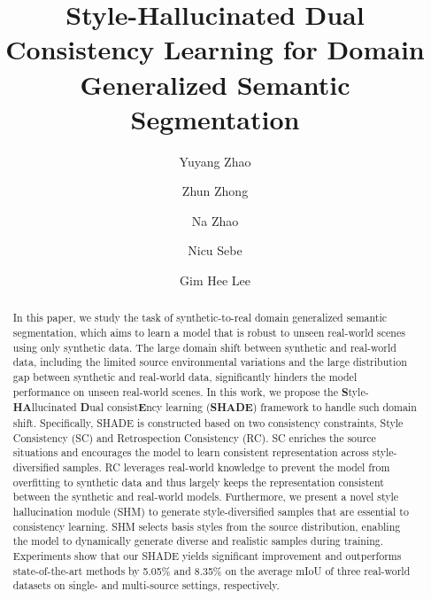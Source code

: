 \documentclass[runningheads]{llncs}
\newcommand{\ours}{SHADE\xspace}
\begin{document}
\pagestyle{headings}
\mainmatter
\def\ECCVSubNumber{86}  

\title{Style-Hallucinated Dual Consistency Learning for Domain Generalized Semantic Segmentation}

\begin{comment}
\end{comment}


\author{Yuyang Zhao \and Zhun Zhong \and Na Zhao \and Nicu Sebe \and Gim Hee Lee}
\maketitle

\begin{abstract}

In this paper, we study the task of synthetic-to-real domain generalized semantic segmentation, which aims to learn a model that is robust to unseen real-world scenes using only synthetic data. The large domain shift between synthetic and real-world data, including the limited source environmental variations and the large distribution gap between synthetic and real-world data, significantly hinders the model performance on unseen real-world scenes. In this work, we propose the \textbf{S}tyle-\textbf{HA}llucinated \textbf{D}ual consist\textbf{E}ncy learning (\textbf{\ours}) framework to handle such domain shift. Specifically, \ours is constructed based on two consistency constraints, Style Consistency (SC) and Retrospection Consistency (RC). SC enriches the source situations and encourages the model to learn consistent representation across style-diversified samples. 
RC leverages real-world knowledge to prevent the model from overfitting to synthetic data and thus largely keeps the representation consistent between the synthetic and real-world models. 
Furthermore, we present a novel style hallucination module (SHM) to generate style-diversified samples that are essential to consistency learning. 
SHM selects basis styles from the source distribution, enabling the model to dynamically generate diverse and realistic samples during training. 
Experiments show that our \ours yields significant improvement and outperforms state-of-the-art methods by 5.05\% and 8.35\% on the average mIoU of three real-world datasets on single- and multi-source settings, respectively.

\end{abstract}
\end{document}
